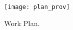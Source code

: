 \begin{figure}[H]
    \centering
    \texttt{[image: plan\_prov]}
    \caption{Work Plan.}
    \label{fig:plan_prov}
\end{figure}









